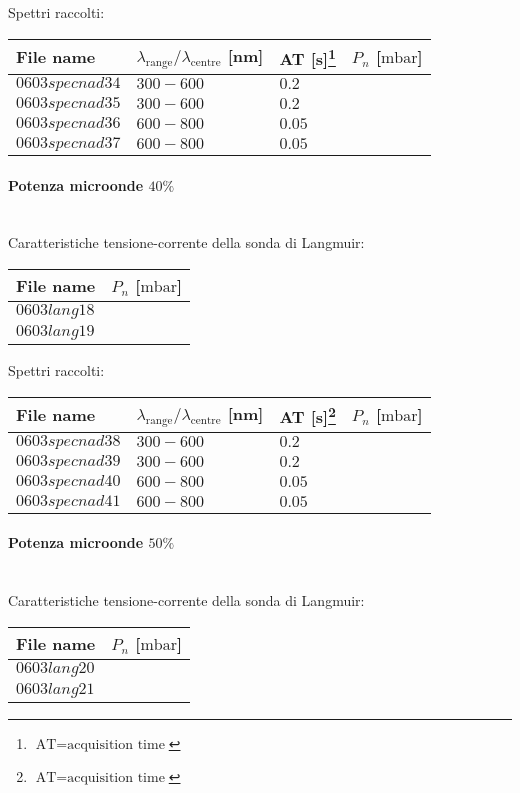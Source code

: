 Spettri raccolti:
\begin{center}
\begin{tabular}{p{3cm}p{4cm}p{2cm}p{3cm}}
\toprule
File name	&$\lambda_\text{range}\text{/}\lambda_\text{centre}$ [nm] &AT [s]\footnote{$\text{AT}=\text{acquisition time}$} &$P_{n}$ [$\si{\milli\bar}$]\\
\midrule
$0603specnad34$	&$300-600$	&$0.2$		&$  $\\
$0603specnad35$	&$300-600$	&$0.2$		&$  $\\
$0603specnad36$	&$600-800$	&$0.05$		&$  $\\
$0603specnad37$	&$600-800$	&$0.05$		&$  $\\
\bottomrule
\end{tabular}
\end{center}

\paragraph*{Potenza microonde $\text{40\%}$} ~\\
Caratteristiche tensione-corrente della sonda di Langmuir:
\begin{center}
\begin{tabular}{p{3cm}p{3cm}}
\toprule
File name	&$P_n$ [$\si{\milli\bar}$]\\
\midrule
$0603lang18$	&$  $\\
$0603lang19$	&$  $\\
\bottomrule
\end{tabular}
\end{center}

Spettri raccolti:
\begin{center}
\begin{tabular}{p{3cm}p{4cm}p{2cm}p{3cm}}
\toprule
File name	&$\lambda_\text{range}\text{/}\lambda_\text{centre}$ [nm] 	&AT [s]\footnote{$\text{AT}=\text{acquisition time}$} &$P_n$ [$\si{\milli\bar}$]\\
\midrule
$0603specnad38$	&$300-600$	&$0.2$		&$  $\\
$0603specnad39$	&$300-600$	&$0.2$		&$  $\\
$0603specnad40$	&$600-800$	&$0.05$		&$  $\\
$0603specnad41$	&$600-800$	&$0.05$		&$  $\\
\bottomrule
\end{tabular}
\end{center}

\paragraph*{Potenza microonde $\text{50\%}$} ~\\
Caratteristiche tensione-corrente della sonda di Langmuir:
\begin{center}
\begin{tabular}{p{3cm}p{3cm}}
\toprule
File name	&$P_n$ [$\si{\milli\bar}$]\\
\midrule
$0603lang20$	&$  $\\
$0603lang21$	&$  $\\
\bottomrule
\end{tabular}
\end{center}

